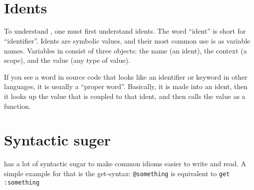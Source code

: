 \begin{bnf*}
\\
\\
\\
\\
\\
\\
\\
 \\
\\
\\
\\
\\
\\
\\
\end{bnf*}
\newpage

\section{Idents}
To understand \dv, one must first understand idents. The word
``ident'' is short for ``identifier''. Idents are symbolic values,
and their most common use is as variable names. Variables in \dv
consist of three objects: the name (an ident), the context (a scope),
and the value (any type of value).

If you see a word in \dv source code that looks like an identifier or
keyword in other languages, it is usually a ``proper word''. Basically, it is made into an
ident, then it looks up the value that is coupled to that ident, and
then calls the value as a function.

\section{Syntactic suger}
\dv has a lot of syntactic sugar to make common idioms easier to write
and read. A simple example for that is the get-syntax: \verb!@something!
is equivalent to \verb!get :something!
